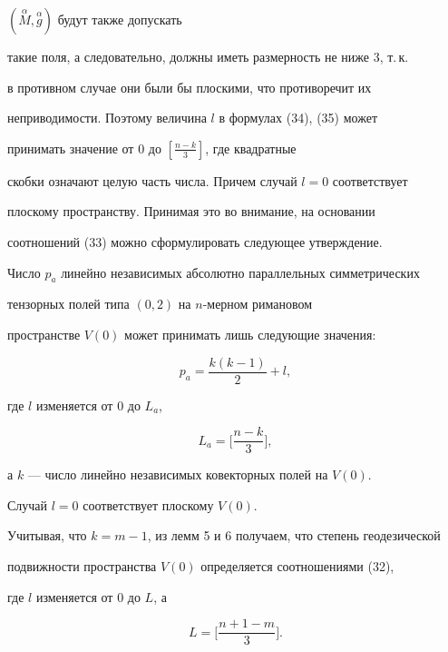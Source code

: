 $(\overset {\alpha}{M}{},\overset {\alpha}{g})$ будут также допускать 


такие поля, а следовательно, должны иметь размерность не ниже 3, т.\,к.


в противном случае они были бы плоскими, что противоречит их 


неприводимости. Поэтому величина $l$ в формулах (34), (35) может 


принимать значение от $0$ до $ [\frac {n-k}3 ]$, где квадратные 


скобки означают целую часть числа. Причем случай $l=0$ соответствует 


плоскому пространству. Принимая это во внимание, на основании 


соотношений (33) можно сформулировать следующее утверждение.





\begin{lem}


Число $p_a$ линейно независимых абсолютно параллельных симметрических 


тензорных полей типа $(0, 2)$ на $n$-мерном римановом 


пространстве $V(0)$ может принимать лишь следующие значения$:$


$$


p_a= \frac {k(k-1)}2 +l,


$$


где $l$ изменяется от $0$ до $L_a$,


$$


L_a=\bigg[\frac {n-k}3 \bigg],


$$ 


а $k$ --- число линейно независимых ковекторных полей на $V(0)$.


Случай $l=0$ соответствует плоскому $V(0)$.


\end{lem}





Учитывая, что $k=m-1$, из лемм 5 и 6 получаем, что степень геодезической 


подвижности пространства $V(0)$ определяется соотношениями (32), 


где $l$ изменяется от $0$ до $L$, а


\begin{equation}


L=\bigg[\frac {n+1-m}3 \bigg].


\end{equation} 






